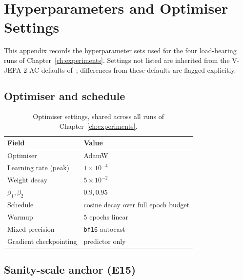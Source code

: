 \chapter{Hyperparameters and Optimiser Settings}
\label{app:hyperparams}

This appendix records the hyperparameter sets used for the four
load-bearing runs of Chapter~\ref{ch:experiments}. Settings not
listed are inherited from the V-JEPA-2-AC defaults
of~\cite{vjepa2_2025}; differences from these defaults are flagged
explicitly.

\section{Optimiser and schedule}
\label{app:opt}

\begin{table}[htbp]
\centering
\begin{tabular}{ll}
\toprule
Field & Value \\
\midrule
Optimiser                   & AdamW \\
Learning rate (peak)        & $1 \times 10^{-4}$ \\
Weight decay                & $5 \times 10^{-2}$ \\
$\beta_{1}, \beta_{2}$      & $0.9, 0.95$ \\
Schedule                    & cosine decay over full epoch budget \\
Warmup                      & $5$ epochs linear \\
Mixed precision             & \texttt{bf16} autocast \\
Gradient checkpointing      & predictor only \\
\bottomrule
\end{tabular}
\caption{Optimiser settings, shared across all runs of
Chapter~\ref{ch:experiments}.}
\label{tab:opt}
\end{table}

\section{Sanity-scale anchor (E15)}
\label{app:cfg-e15}


